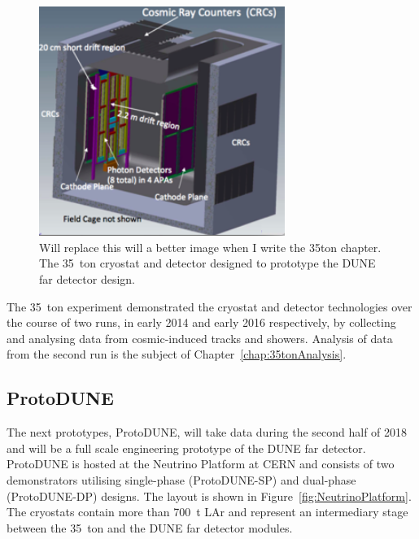 \begin{figure}
  \centering
  \includegraphics[width=8cm]{35ton.png}
  \caption[The 35~ton cryostat and detector designed to prototype the DUNE far detector design.]{{\color{red}Will replace this will a better image when I write the 35ton chapter.} The 35~ton cryostat and detector designed to prototype the DUNE far detector design.}
  \label{fig:DUNE35ton}
\end{figure}

The 35~ton experiment demonstrated the cryostat and detector technologies over the course of two runs, in early 2014 and early 2016 respectively, by collecting and analysing data from cosmic-induced tracks and showers.  Analysis of data from the second run is the subject of Chapter~\ref{chap:35tonAnalysis}.

\subsection{ProtoDUNE}\label{sec:ProtoDUNE}

The next prototypes, ProtoDUNE, will take data during the second half of 2018 and will be a full scale engineering prototype of the DUNE far detector.  ProtoDUNE is hosted at the Neutrino Platform at CERN and consists of two demonstrators utilising single-phase (ProtoDUNE-SP) \cite{ProtoDUNE-SP} and dual-phase (ProtoDUNE-DP) \cite{WA105} designs.  The layout is shown in Figure~\ref{fig:NeutrinoPlatform}.  The cryostats contain more than 700~t LAr and represent an intermediary stage between the 35~ton and the DUNE far detector modules.

